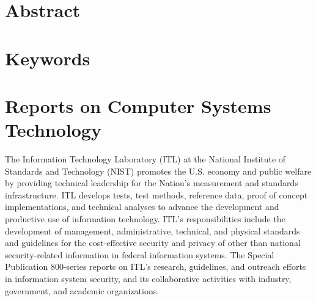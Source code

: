 \section*{Abstract}


\section*{Keywords} 


\section*{Reports on Computer Systems Technology}

The Information Technology Laboratory (ITL) at the National Institute of Standards and Technology (NIST) promotes the U.S. economy and public welfare by providing technical leadership for the Nation’s measurement and standards infrastructure. ITL develops tests, test methods, reference data, proof of concept implementations, and technical analyses to advance the development and productive use of information technology. ITL’s responsibilities include the development of management, administrative, technical, and physical standards and guidelines for the cost-effective security and privacy of other than national security-related information in federal information systems. The Special Publication 800-series reports on ITL’s research, guidelines, and outreach efforts in information system security, and its collaborative activities with industry, government, and academic organizations.
